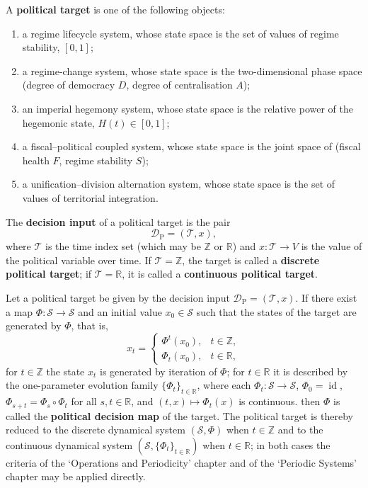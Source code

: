 \begin{definition}\label{def:politics_target}
A \textbf{political target} is one of the following objects:
\begin{enumerate}[label=(\roman*)]
    \item a regime lifecycle system, whose state space is the set of values of regime stability, $[0,1]$;
    \item a regime-change system, whose state space is the two-dimensional phase space (degree of democracy $D$, degree of centralisation $A$);
    \item an imperial hegemony system, whose state space is the relative power of the hegemonic state, $H(t)\in[0,1]$;
    \item a fiscal--political coupled system, whose state space is the joint space of (fiscal health $F$, regime stability $S$);
    \item a unification--division alternation system, whose state space is the set of values of territorial integration.
\end{enumerate}
The \textbf{decision input} of a political target is the pair
\[
\mathcal D_{\mathrm{P}}=(\mathcal T,x),
\]
where $\mathcal T$ is the time index set (which may be $\mathbb Z$ or $\mathbb R$) and $x:\mathcal T\to V$ is the value of the political variable over time. If $\mathcal T=\mathbb Z$, the target is called a \textbf{discrete political target}; if $\mathcal T=\mathbb R$, it is called a \textbf{continuous political target}.
\end{definition}

\begin{definition}\label{def:politics_periodization}
Let a political target be given by the decision input $\mathcal D_{\mathrm{P}}=(\mathcal T,x)$. If there exist a map $\Phi:\mathcal S\to\mathcal S$ and an initial value $x_0\in\mathcal S$ such that the states of the target are generated by $\Phi$, that is,
\[
x_t=\begin{cases}\Phi^t(x_0), & t\in\mathbb Z,\\ \Phi_t(x_0), & t\in\mathbb R,\end{cases}
\]
for $t\in\mathbb Z$ the state $x_t$ is generated by iteration of $\Phi$; for $t\in\mathbb R$ it is described by the one-parameter evolution family $\{\Phi_t\}_{t\in\mathbb R}$, where each $\Phi_t:\mathcal S\to\mathcal S$, $\Phi_0=\operatorname{id}$, $\Phi_{s+t}=\Phi_s\circ\Phi_t$ for all $s,t\in\mathbb R$, and $(t,x)\mapsto\Phi_t(x)$ is continuous.
then $\Phi$ is called the \textbf{political decision map} of the target. The political target is thereby reduced to the discrete dynamical system $(\mathcal S,\Phi)$ when $t\in\mathbb Z$ and to the continuous dynamical system $(\mathcal S,\{\Phi_t\}_{t\in\mathbb R})$ when $t\in\mathbb R$; in both cases the criteria of the `Operations and Periodicity' chapter and of the `Periodic Systems' chapter may be applied directly.
\end{definition}

